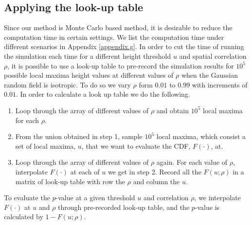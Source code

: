 \documentclass{article}
\begin{document}
\subsection{Applying the look-up table} 
\label{appendix.d3}
Since our method is Monte Carlo based method, it is desirable to reduce the computation time in certain settings. We list the computation time under different scenarios in Appendix \ref{appendix.g}. In order to cut the time of running the simulation each time for a different height threshold $u$ and spatial correlation $\rho$, it is possible to use a look-up table to pre-record the simulation results for $10^5$ possible local maxima height values at different values of $\rho$ when the Gaussian random field is isotropic. To do so we vary $\rho$ form $0.01$ to $0.99$ with increments of $0.01$. In order to calculate a look up table we do the following.
\begin{enumerate}
    \item Loop through the array of different values of $\rho$ and obtain $10^5$ local maxima for each $\rho$.
    \item From the union obtained in step 1, sample $10^5$ local maxima, which consist a set of local maxima, $u$, that we want to evaluate the CDF, $F(\cdot)$, at.
    \item Loop through the array of different values of $\rho$ again. For each value of $\rho$, interpolate $F(\cdot)$ at each of $u$ we get in step 2. Record all the $F(u;\rho)$ in a matrix of look-up table with row the $\rho$ and column the $u$.
\end{enumerate}
To evaluate the $p$-value at a given threshold $u$ and correlation $\rho$, we interpolate $F(\cdot)$ at $u$ and $\rho$ through pre-recorded look-up table, and the $p$-value is calculated by $1-F(u;\rho)$.
\end{document}
